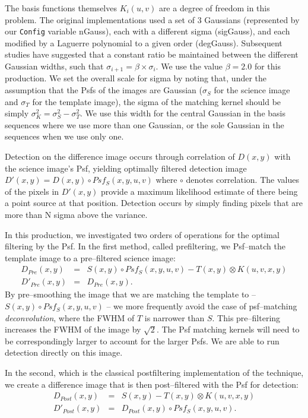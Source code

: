 \documentclass[prd, nofootinbib, floatfix, 11pt,tightenlines,times]{article}
\begin{document}
The basis functions themselves $K_i(u,v)$ are a degree of freedom in
this problem.  The original implementations \citep{Alard98,Alard00}
used a set of 3 Gaussians (represented by our {\tt Config} variable
nGauss), each with a different sigma (sigGauss), and each modified by
a Laguerre polynomial to a given order (degGauss).  Subsequent studies
\citep[e.g.][]{2007AN....328...16I} have suggested that a constant
ratio be maintained between the different Gaussian widths, such that
$\sigma_{i+1} = \beta \times \sigma_{i}$.  We use the value $\beta =
2.0$ for this production.  We set the overall scale for sigma by
noting that, under the assumption that the Psfs of the images are
Gaussian ($\sigma_S$ for the science image and $\sigma_T$ for the
template image), the sigma of the matching kernel should be simply
$\sigma_K^2 = \sigma_S^2 - \sigma_T^2$.  We use this width for the
central Gaussian in the basis sequences where we use more than one
Gaussian, or the sole Gaussian in the sequences when we use only one.

Detection on the difference image occurs through correlation of
$D(x,y)$ with the science image's Psf, yielding optimally filtered
detection image $D'(x,y) = D(x,y) \circ Psf_S(x,y,u,v)$ where $\circ$
denotes correlation.  The values of the pixels in $D'(x,y)$ provide a
maximum likelihood estimate of there being a point source at that
position.  Detection occurs by simply finding pixels that are more
than N sigma above the variance.  

In this production, we investigated two orders of operations for the
optimal filtering by the Psf.  In the first method, called
prefiltering, we Psf--match the template image to a pre--filtered
science image:
\begin{eqnarray}
D_{Pre}(x,y) & = & S(x,y) \circ Psf_S(x,y,u,v) - T(x,y) \otimes K(u,v,x,y) \nonumber \\ 
D'_{Pre}(x,y) & = & D_{Pre}(x,y). \nonumber 
\end{eqnarray}
By pre--smoothing the image that we are matching the template to --
$S(x,y) \circ Psf_S(x,y,u,v)$ -- we more frequently avoid the case
of psf--matching {\it deconvolution}, where the FWHM of $T$ is
narrower than $S$.  This pre--filtering increases the FWHM of the
image by $\sqrt{2}$.  The Psf matching kernels will need to be
correspondingly larger to account for the larger Psfs.  We are able to
run detection directly on this image.

In the second, which is the classical postfiltering implementation of
the technique, we create a difference image that is then
post--filtered with the Psf for detection:
\begin{eqnarray}
D_{Post}(x,y) & = & S(x,y) - T(x,y) \otimes K(u,v,x,y) \nonumber \\ 
D'_{Post}(x,y) & = & D_{Post}(x,y) \circ Psf_S(x,y,u,v).  \nonumber 
\end{eqnarray}
\end{document}
